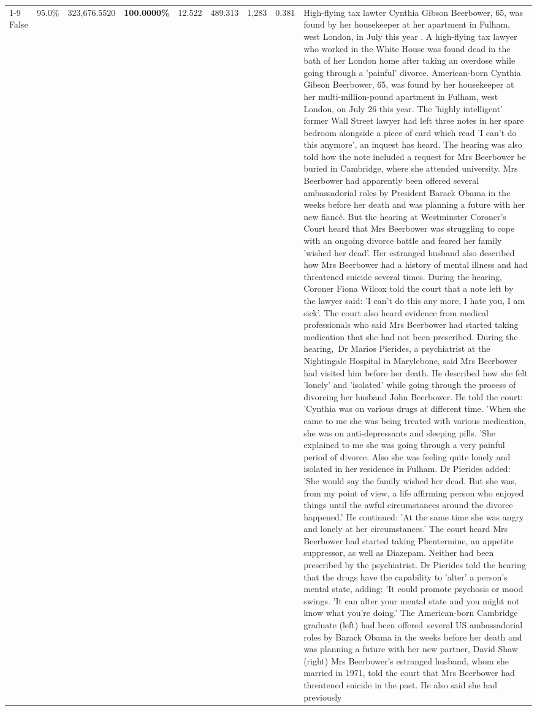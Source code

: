 \begin{table}[H]
\begin{tabular}{lllrlllll}
\cline{1-9}
False & 95.0\% & 323,676.5520 & \bfseries \color{red} 100.0000\% & 12.522 & 489.313 & 1,283 & 0.381 & High-flying tax lawter Cynthia Gibson Beerbower, 65, was found by her housekeeper at her apartment in Fulham, west London, in July this year . A high-flying tax lawyer who worked in the White House was found dead in the bath of her London home after taking an overdose while going through a 'painful' divorce. American-born Cynthia Gibson Beerbower, 65, was found by her housekeeper at her multi-million-pound apartment in Fulham, west London, on July 26 this year. The 'highly intelligent' former Wall Street lawyer had left three notes in her spare bedroom alongside a piece of card which read 'I can't do this anymore', an inquest has heard. The hearing was also told how the note included a request for Mrs Beerbower be buried in Cambridge, where she attended university. Mrs Beerbower had apparently been offered several ambassadorial roles by President Barack Obama in the weeks before her death and was planning a future with her new fiancé. But the hearing at Westminster Coroner's Court heard that Mrs Beerbower was struggling to cope with an ongoing divorce battle and feared her family 'wished her dead'. Her estranged husband also described how Mrs Beerbower had a history of mental illness and had threatened suicide several times. During the hearing, Coroner Fiona Wilcox told the court that a note left by the lawyer said: 'I can't do this any more, I hate you, I am sick'. The court also heard evidence from medical professionals who said Mrs Beerbower had started taking medication that she had not been prescribed. During the hearing, Dr Marios Pierides, a psychiatrist at the Nightingale Hospital in Marylebone, said Mrs Beerbower had visited him before her death. He described how she felt 'lonely' and 'isolated' while going through the process of divorcing her husband John Beerbower. He told the court: 'Cynthia was on various drugs at different time. 'When she came to me she was being treated with various medication, she was on anti-depressants and sleeping pills. 'She explained to me she was going through a very painful period of divorce. Also she was feeling quite lonely and isolated in her residence in Fulham. Dr Pierides added: 'She would say the family wished her dead. But she was, from my point of view, a life affirming person who enjoyed things until the awful circumstances around the divorce happened.' He continued: 'At the same time she was angry and lonely at her circumstances.' The court heard Mrs Beerbower had started taking Phentermine, an appetite suppressor, as well as Diazepam. Neither had been prescribed by the psychiatrist. Dr Pierides told the hearing that the drugs have the capability to 'alter' a person's mental state, adding: 'It could promote psychosis or mood swings. 'It can alter your mental state and you might not know what you're doing.' The American-born Cambridge graduate (left) had been offered several US ambassadorial roles by Barack Obama in the weeks before her death and was planning a future with her new partner, David Shaw (right) Mrs Beerbower's estranged husband, whom she married in 1971, told the court that Mrs Beerbower had threatened suicide in the past. He also said she had previously 
\end{tabular}
\end{table}
